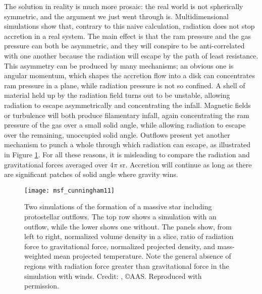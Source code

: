 The solution in reality is much more prosaic: the real world is not spherically symmetric, and the argument we just went through is. Multidimensional simulations show that, contrary to this naive calculation, radiation does not stop accretion in a real system. The main effect is that the ram pressure and the gas pressure can both be asymmetric, and they will conspire to be anti-correlated with one another because the radiation will escape by the path of least resistance. This asymmetry can be produced by many mechanisms; an obvious one is angular momentum, which shapes the accretion flow into a disk can concentrates ram pressure in a plane, while radiation pressure is not so confined. A shell of material held up by the radiation field turns out to be unstable, allowing radiation to escape asymmetrically and concentrating the infall. Magnetic fields or turbulence will both produce filamentary infall, again concentrating the ram pressure of the gas over a small solid angle, while allowing radiation to escape over the remaining, unoccupied solid angle. Outflows present yet another mechanism to punch a whole through which radiation can escape, as illustrated in Figure \ref{fig:msf_cunningham11}. For all these reasons, it is misleading to compare the radiation and gravitational forces averaged over $4\pi$ sr. Accretion will continue as long as there are significant patches of solid angle where gravity wins.

\begin{figure}
\texttt{[image: msf\_cunningham11]}
\caption[Simulation of massive star formation with outflows]{
\label{fig:msf_cunningham11}
Two simulations of the formation of a massive star including protostellar outflows. The top row shows a simulation with an outflow, while the lower shows one without. The panels show, from left to right, normalized volume density in a slice, ratio of radiation force to gravitational force, normalized projected density, and mass-weighted mean projected temperature. Note the general absence of regions with radiation force greater than gravitational force in the simulation with winds. Credit: \citet{cunningham11a}, \copyright AAS. Reproduced with permission.
}
\end{figure}

